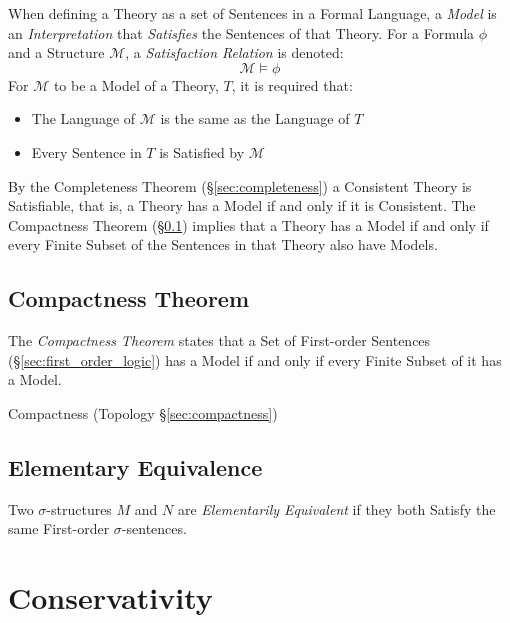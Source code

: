 When defining a Theory as a set of Sentences in a Formal Language, a
\emph{Model} is an \emph{Interpretation} that \emph{Satisfies} the
Sentences of that Theory. For a Formula $\phi$ and a Structure
$\mathcal{M}$, a \emph{Satisfaction Relation} is denoted:
\[
    \mathcal{M} \vDash \phi
\]
For $\mathcal{M}$ to be a Model of a Theory, $T$, it is required that:
\begin{itemize}
\item The Language of $\mathcal{M}$ is the same as the Language of $T$
\item Every Sentence in $T$ is Satisfied by $\mathcal{M}$
\end{itemize}
By the Completeness Theorem (\S\ref{sec:completeness}) a Consistent
Theory is Satisfiable, that is, a Theory has a Model if and only if it
is Consistent. The Compactness Theorem
(\S\ref{sec:compactness_theorem}) implies that a Theory has a Model if
and only if every Finite Subset of the Sentences in that Theory also
have Models.



\subsection{Compactness Theorem}\label{sec:compactness_theorem}

The \emph{Compactness Theorem} states that a Set of First-order
Sentences (\S\ref{sec:first_order_logic}) has a Model if and only if
every Finite Subset of it has a Model.

Compactness (Topology \S\ref{sec:compactness})



\subsection{Elementary Equivalence}\label{sec:elementary_equivalence}

Two $\sigma$-structures $M$ and $N$ are \emph{Elementarily Equivalent}
if they both Satisfy the same First-order $\sigma$-sentences.



\section{Conservativity}\label{sec:conservativity}



